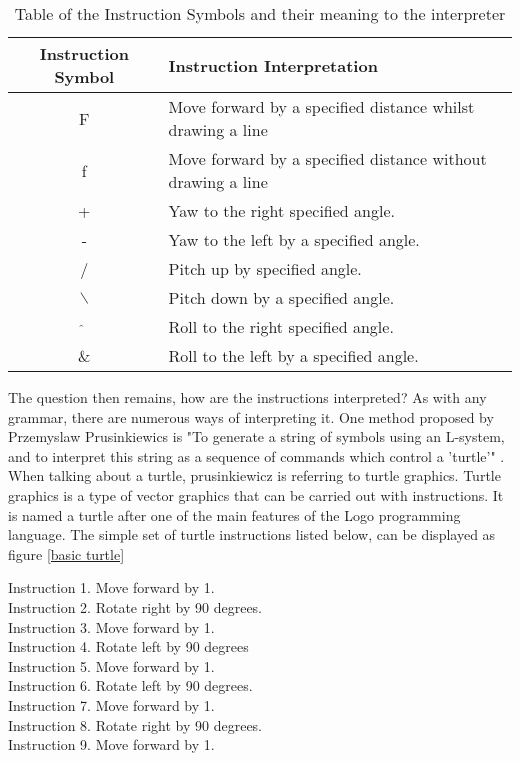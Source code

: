 \begin{flushleft}
\begin{table}[h!]
\begin{tabular}{ | c | l | }
\hline
	Instruction Symbol 	& Instruction Interpretation \\  
\hline
\hline
	F 					& Move forward by a specified distance whilst drawing a line\\
\hline
	f 					& Move forward by a specified distance without drawing a line\\
\hline
	+ 					& Yaw to the right specified angle.\\
\hline
	- 					& Yaw to the left by a specified angle.\\
\hline
	/ 					& Pitch up by specified angle. \\
\hline
	$\backslash$ 		& Pitch down by a specified angle.\\
\hline
	$\hat{}$ 			& Roll to the right specified angle.\\
\hline
	\& 					& Roll to the left by a specified angle.\\
\hline
\end{tabular}
\caption{Table of the Instruction Symbols and their meaning to the interpreter}
\label{instruction table 1}
\end{table}

\vspace{5mm}

The question then remains, how are the instructions interpreted? As with any grammar, there are numerous ways of interpreting it. One method proposed by Przemyslaw Prusinkiewics is "To generate a string of symbols using an L-system, and to interpret this string as a sequence of commands which control a 'turtle'" \cite{prusinkiewicz1986graphical}. When talking about a turtle, prusinkiewicz is referring to turtle graphics. Turtle graphics is a type of vector graphics that can be carried out with instructions. It is named a turtle after one of the main features of the Logo programming language. The simple set of turtle instructions listed below, can be displayed as figure \ref{basic turtle}\\

\vspace{5mm}

Instruction 1. Move forward by 1.\\
Instruction 2. Rotate right by 90 degrees.\\
Instruction 3. Move forward by 1.\\
Instruction 4. Rotate left by 90 degrees \\
Instruction 5. Move forward by 1. \\
Instruction 6. Rotate left by 90 degrees. \\
Instruction 7. Move forward by 1. \\
Instruction 8. Rotate right by 90 degrees. \\
Instruction 9. Move forward by 1.\\


\end{flushleft}
